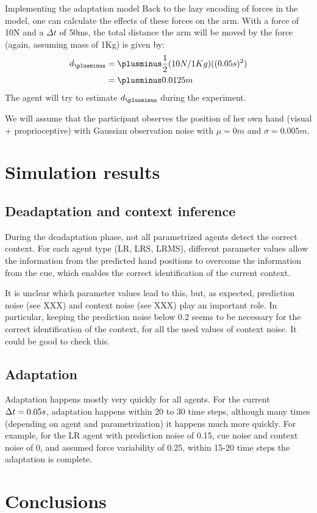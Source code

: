 \documentclass{report}
\begin{document}
\begin{chapter}{Implementing the adaptation model}
Back to the lazy encoding of forces in the model, one can calculate the effects
of these forces on the arm. With a force of 10N and a $\Delta t$ of 50ms, the
total distance the arm will be moved by the force (again, assuming mass of 1Kg)
is given by:
\begin{align}
  d_\plusminus &= \plusminus \frac{1}{2}(\force / 1Kg)((\dt)^2)\\
               &= \plusminus 0.0125m
\end{align}
The agent will try to estimate $d_\plusminus$ during the experiment.

We will assume  that
the participant observes the position of her own hand (visual + proprioceptive)
with Gaussian observation noise with $\mu = 0m$ and $\sigma = 0.005m$.

\section{Simulation results}
\subsection{Deadaptation and context inference}
During the deadaptation phase, not all parametrized agents detect the correct context. For each agent type (LR, LRS, LRMS), different parameter values allow the information from the predicted hand positions to overcome the information from the cue, which enables the correct identification of the current context.

It is unclear which parameter values lead to this, but, as expected, prediction noise (see XXX) and context noise (see XXX) play an important role. In particular, keeping the prediction noise below 0.2 seems to be necessary for the correct identification of the context, for all the used values of context noise. It could be good to check this.


\subsection{Adaptation}
Adaptation happens mostly very quickly for all agents. For the current $\Delta t = 0.05s$, adaptation happens within 20 to 30 time steps, although many times (depending on agent and parametrization) it happens much more quickly. For example, for the LR agent with prediction noise of 0.15, cue noise and context noise of 0, and assumed force variability of 0.25, within 15-20 time steps the adaptation is complete.
\section{Conclusions}



\end{chapter}







\end{document}
